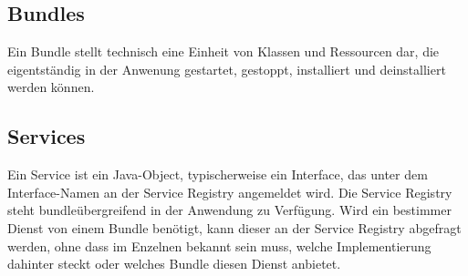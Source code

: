\subsection{Bundles}
Ein Bundle stellt technisch eine Einheit von Klassen und Ressourcen dar, die
eigentständig in der Anwenung gestartet, gestoppt, installiert und
deinstalliert werden können.
\citep{wtherich_die_2008}

\subsection{Services} %
Ein Service ist ein Java-Object, typischerweise ein Interface, das unter dem
Interface-Namen an der Service Registry angemeldet wird.
Die Service Registry steht bundleübergreifend in der Anwendung zu Verfügung.
Wird ein bestimmer Dienst von einem Bundle benötigt, kann dieser an der Service
Registry abgefragt werden, ohne dass im Enzelnen bekannt sein muss, welche
Implementierung dahinter steckt oder welches Bundle diesen Dienst anbietet.
\citep{wtherich_die_2008}